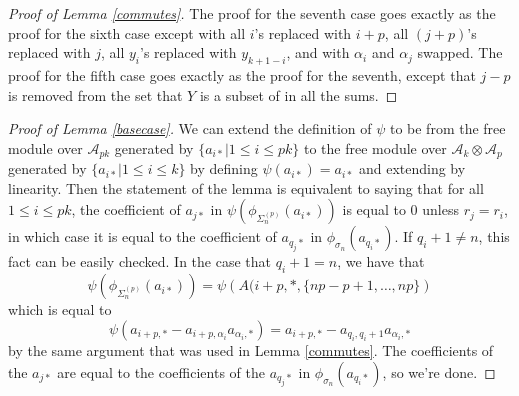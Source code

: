 \documentclass[11pt]{amsart}
\def\A{{\mathcal A}}
\def\s{{\sigma}}
\def\a{\alpha}
\newcommand\id{\operatorname{id}}
\newcommand\Sp{\Sigma^{(p)}}
\begin{document}
\begin{proof} [Proof of Lemma \ref{commutes}]
The proof for the seventh case goes exactly as the proof for the sixth case except with all $i$'s replaced with $i+p$, all $(j+p)$'s replaced with $j$, all $y_i$'s replaced with $y_{k+1-i}$, and with $\a_i$ and $\a_j$ swapped.  The proof for the fifth case goes exactly as the proof for the seventh, except that $j-p$ is removed from the set that $Y$ is a subset of in all the sums.


%
%
%

\end{proof}



\begin{proof} [Proof of Lemma \ref{basecase}]
We can extend the definition of $\psi$ to be from the free module over $\A_{pk}$ generated by $\{a_{i*}|1\le i\le pk\}$ to the free module over $\A_{k}\otimes \A_{p}$ generated by $\{a_{i*}|1\le i\le k\}$ by defining $\psi(a_{i*}) = a_{i*}$ and extending by linearity.  Then the statement of the lemma is equivalent to saying that for all $1\le i\le pk$, the coefficient of $a_{j*}$ in $\psi\left(\phi_{\Sp_n}(a_{i*})\right)$ is equal to 0 unless $r_j = r_i$, in which case it is equal to the coefficient of $a_{q_j*}$ in $\phi_{\s_n}(a_{q_i*})$.  If $q_i + 1 \ne n$, this fact can be easily checked.  In the case that $q_i + 1 = n$, we have that
$$\psi\left(\phi_{\Sp_n}(a_{i*})\right) = \psi\left(A(i+p,*,\{np-p+1,\ldots,np\}\right)$$
\noindent which is equal to
$$\psi(a_{i+p,*} - a_{i+p,\a_i}a_{\a_i,*}) = a_{i+p,*} - a_{q_i,q_i+1}a_{\a_i,*}$$
by the same argument that was used in Lemma \ref{commutes}.  The coefficients of the $a_{j*}$ are equal to the coefficients of the $a_{q_j*}$ in $\phi_{\s_n}(a_{q_i*})$, so we're done.
\end{proof}














\end{document}

